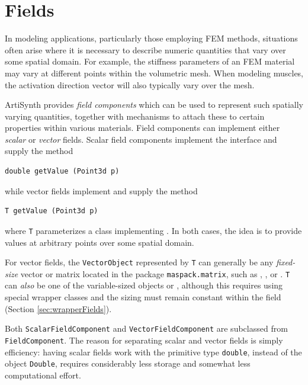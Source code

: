 \ifdefined\maindoc\else
\def\doctitle{Fields}

\mainmatter
\fi

\chapter{Fields}
\label{sec:fields}

In modeling applications, particularly those employing FEM methods,
situations often arise where it is necessary to describe numeric
quantities that vary over some spatial domain. For example, the
stiffness parameters of an FEM material may vary at different points
within the volumetric mesh.  When modeling muscles, the activation
direction vector will also typically vary over the mesh.

ArtiSynth provides {\it field components} which can be used to
represent such spatially varying quantities, together with mechanisms
to attach these to certain properties within various materials.  Field
components can implement either {\it scalar} or {\it vector}
fields. Scalar field components implement the interface
 and supply
the method
%
\begin{lstlisting}[]
   double getValue (Point3d p)
\end{lstlisting}
%
while vector fields implement
and supply the method
%
\begin{lstlisting}[]
   T getValue (Point3d p)
\end{lstlisting}
%
where {\tt T} parameterizes a class implementing
.  In both cases, the idea is
to provide values at arbitrary points over some spatial domain.

For vector fields, the {\tt VectorObject} represented by {\tt T} can
generally be any {\it fixed-size} vector or matrix located in the
package {\tt maspack.matrix}, such as
,
, or
. {\tt T} can {\it also} be one of
the variable-sized objects  or
, although this requires using
special wrapper classes and the sizing must remain constant within the
field (Section \ref{sec:wrapperFields}).

\begin{sideblock}
Both {\tt ScalarFieldComponent} and {\tt VectorFieldComponent} are
subclassed from {\tt FieldComponent}. The reason for separating scalar
and vector fields is simply efficiency: having scalar fields work with
the primitive type {\tt double}, instead of the object {\tt Double},
requires considerably less storage and somewhat less computational
effort.
\end{sideblock}

